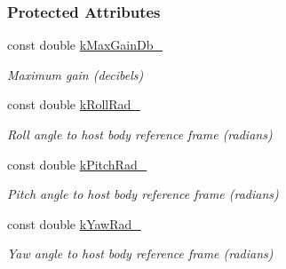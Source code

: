 \subsubsection*{Protected Attributes}
\begin{DoxyCompactItemize}
\item 
\mbox{\label{classosse_1_1collaborate_1_1_antenna_a3bb8d000dfd0dbd4713cc1c4fbc8772e}} 
const double \hyperlink{classosse_1_1collaborate_1_1_antenna_a3bb8d000dfd0dbd4713cc1c4fbc8772e}{k\+Max\+Gain\+Db\+\_\+}
\begin{DoxyCompactList}\small\item\em Maximum gain (decibels) \end{DoxyCompactList}\item 
\mbox{\label{classosse_1_1collaborate_1_1_antenna_aff899094f1534787d2ce4899a6d1babb}} 
const double \hyperlink{classosse_1_1collaborate_1_1_antenna_aff899094f1534787d2ce4899a6d1babb}{k\+Roll\+Rad\+\_\+}
\begin{DoxyCompactList}\small\item\em Roll angle to host body reference frame (radians) \end{DoxyCompactList}\item 
\mbox{\label{classosse_1_1collaborate_1_1_antenna_a05c6fd112ee735a371ed48f0a9b3701f}} 
const double \hyperlink{classosse_1_1collaborate_1_1_antenna_a05c6fd112ee735a371ed48f0a9b3701f}{k\+Pitch\+Rad\+\_\+}
\begin{DoxyCompactList}\small\item\em Pitch angle to host body reference frame (radians) \end{DoxyCompactList}\item 
\mbox{\label{classosse_1_1collaborate_1_1_antenna_abb5b0f5a06d029eba6029f143588c99b}} 
const double \hyperlink{classosse_1_1collaborate_1_1_antenna_abb5b0f5a06d029eba6029f143588c99b}{k\+Yaw\+Rad\+\_\+}
\begin{DoxyCompactList}\small\item\em Yaw angle to host body reference frame (radians) \end{DoxyCompactList}\end{DoxyCompactItemize}


